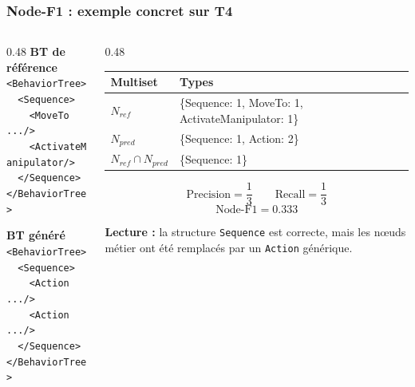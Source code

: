 \documentclass[aspectratio=169]{beamer}
\begin{document}
\begin{frame}
  \frametitle{Node-F1 : exemple concret sur T4}

  \scriptsize
  \begin{columns}[T]
    \begin{column}{0.48\textwidth}
      \textbf{BT de référence}\\
      \texttt{<BehaviorTree>}\\
      \texttt{\ \ <Sequence>}\\
      \texttt{\ \ \ \ <MoveTo .../>}\\
      \texttt{\ \ \ \ <ActivateManipulator/>}\\
      \texttt{\ \ </Sequence>}\\
      \texttt{</BehaviorTree>}

      \vspace{0.5em}
      \textbf{BT généré}\\
      \texttt{<BehaviorTree>}\\
      \texttt{\ \ <Sequence>}\\
      \texttt{\ \ \ \ <Action .../>}\\
      \texttt{\ \ \ \ <Action .../>}\\
      \texttt{\ \ </Sequence>}\\
      \texttt{</BehaviorTree>}
    \end{column}
    \begin{column}{0.48\textwidth}
      \begin{tabular}{p{}p{}}
        \toprule
        Multiset & Types \\
        \midrule
        $N_{ref}$ & \{Sequence: 1, MoveTo: 1, ActivateManipulator: 1\} \\
        $N_{pred}$ & \{Sequence: 1, Action: 2\} \\
        $N_{ref} \cap N_{pred}$ & \{Sequence: 1\} \\
        \bottomrule
      \end{tabular}

      \vspace{0.6em}
      \[
        \mathrm{Precision} = \frac{1}{3}
        \qquad
        \mathrm{Recall} = \frac{1}{3}
      \]
      \[
        \mathrm{Node\text{-}F1} = 0.333
      \]

      \vspace{0.3em}
      \textbf{Lecture :} la structure \texttt{Sequence} est correcte, mais les nœuds métier ont été remplacés par un \texttt{Action} générique.
    \end{column}
  \end{columns}
\end{frame}
\end{document}

